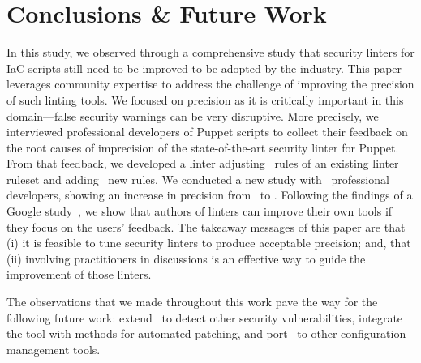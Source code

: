 %
\section{Conclusions \& Future Work}\label{sec:conclusion}
%
In this study, we observed through a comprehensive study that 
security linters for IaC scripts still need to be improved to 
be adopted by the industry. This paper leverages community expertise 
to address the challenge of improving the precision of such linting 
tools. We focused on precision as it is critically important 
in this domain---false security warnings can be very disruptive. 
More precisely, we interviewed professional developers
of Puppet scripts to collect their feedback on the root causes of
imprecision of the state-of-the-art security linter for Puppet. From
that feedback, we developed a linter adjusting \noRulesSlic\ rules
of an existing linter ruleset and adding \newRules\ new rules. We
conducted a new study with \noProfessionals\ professional developers,
showing an increase in precision from \botPrecision\ to \finalPrecision.
Following the findings of a Google study~\cite{46576}, we show that 
authors of linters can improve their own tools if they focus 
on the users' feedback.
The takeaway messages of this paper are that (i) it is feasible to
tune security linters to produce acceptable precision; and, that 
(ii) involving practitioners in
discussions is an effective way to guide the improvement of those
linters. 

The observations that we made throughout this work pave the
way for the following future work: extend \toolname\ to detect other
security vulnerabilities, integrate the tool with methods for
automated patching, and port \toolname\ to other configuration
management tools.
